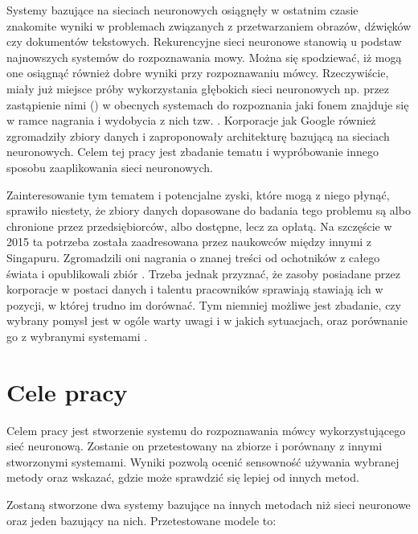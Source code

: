 Systemy bazujące na sieciach neuronowych osiągnęły w ostatnim czasie znakomite wyniki w problemach
związanych z przetwarzaniem obrazów, dźwięków czy dokumentów tekstowych. Rekurencyjne sieci neuronowe
stanowią u podstaw najnowszych systemów do rozpoznawania mowy. Można się spodziewać, iż mogą one
osiągnąć również dobre wyniki przy rozpoznawaniu mówcy. Rzeczywiście, miały już miejsce próby
wykorzystania głębokich sieci neuronowych np. przez zastąpienie nimi
 () w obecnych systemach do rozpoznania
jaki fonem znajduje się w ramce nagrania i wydobycia z nich tzw.
\cite{investigationOfBottleneck}.
Korporacje jak Google również zgromadziły zbiory danych i zaproponowały architekturę bazującą na sieciach
neuronowych\cite{endToEnd}. Celem tej pracy jest zbadanie tematu i wypróbowanie innego sposobu zaaplikowania
sieci neuronowych.

Zainteresowanie tym tematem i potencjalne zyski, które mogą z niego płynąć, sprawiło niestety,
że zbiory danych dopasowane do badania tego problemu są albo chronione przez przedsiębiorców,
albo dostępne, lecz za opłatą. Na szczęście w 2015 ta potrzeba
została zaadresowana przez naukowców między innymi z Singapuru. Zgromadzili oni nagrania o znanej
treści od ochotników z całego świata i opublikowali zbiór . Trzeba jednak przyznać, że
zasoby posiadane przez korporacje w postaci danych i talentu pracowników sprawiają stawiają ich
w pozycji, w której trudno im dorównać.  Tym niemniej możliwe jest zbadanie, czy wybrany pomysł
jest w ogóle warty uwagi i w jakich sytuacjach, oraz porównanie go z wybranymi systemami .

\section{Cele pracy}\label{sec:cele_pracy}

Celem pracy jest stworzenie systemu do rozpoznawania mówcy wykorzystującego sieć neuronową.
Zostanie on przetestowany na zbiorze  i porównany z innymi stworzonymi systemami.
Wyniki pozwolą ocenić sensowność używania wybranej metody oraz wskazać, gdzie może sprawdzić się lepiej
od innych metod.

Zostaną stworzone dwa systemy bazujące na innych metodach niż sieci neuronowe oraz jeden bazujący na nich. Przetestowane
modele to:

